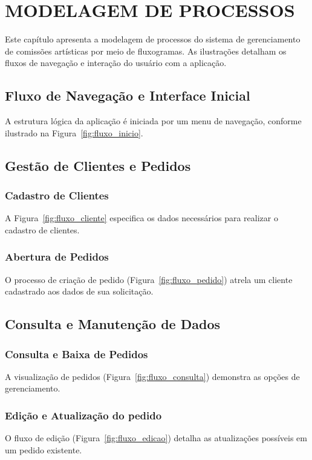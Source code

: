 \chapter{MODELAGEM DE PROCESSOS}
Este capítulo apresenta a modelagem de processos do sistema de gerenciamento
de comissões artísticas por meio de fluxogramas. As ilustrações detalham
os fluxos de navegação e interação do usuário com a aplicação.
\section{Fluxo de Navegação e Interface Inicial}
A estrutura lógica da aplicação é iniciada por um menu de navegação, 
conforme ilustrado na Figura~\ref{fig:fluxo_inicio}.
\section{Gestão de Clientes e Pedidos}
\subsection{Cadastro de Clientes}
A Figura~\ref{fig:fluxo_cliente} especifica os dados necessários para 
realizar o cadastro de clientes.
\subsection{Abertura de Pedidos}
O processo de criação de pedido (Figura~\ref{fig:fluxo_pedido}) atrela 
um cliente cadastrado aos dados de sua solicitação.
\section{Consulta e Manutenção de Dados}
\subsection{Consulta e Baixa de Pedidos}
A visualização de pedidos (Figura~\ref{fig:fluxo_consulta}) demonstra as 
opções de gerenciamento.
\subsection{Edição e Atualização do pedido}
O fluxo de edição (Figura~\ref{fig:fluxo_edicao}) detalha as atualizações 
possíveis em um pedido existente.
